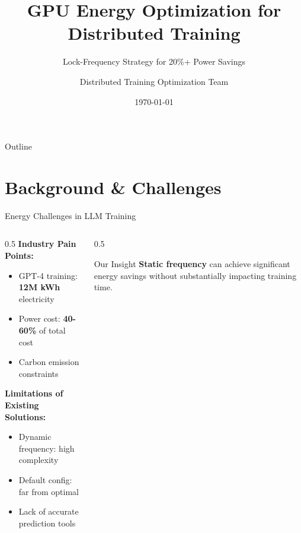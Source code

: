 \documentclass[aspectratio=169,10pt]{beamer}
\title[GPU Energy Optimization]{\textbf{GPU Energy Optimization for Distributed Training}}
\subtitle{Lock-Frequency Strategy for 20\%+ Power Savings}
\author[Team]{Distributed Training Optimization Team}
\institute[]{Megatron-DeepSpeed Energy Efficiency Project}
\date{\today}
\begin{document}
{
\begin{frame}
\titlepage
\end{frame}
}

\begin{frame}{Outline}
\tableofcontents
\end{frame}

\section{Background \& Challenges}

\begin{frame}{Energy Challenges in LLM Training}
\begin{columns}
\begin{column}{0.5\textwidth}
\textbf{Industry Pain Points:}
\begin{itemize}
    \item GPT-4 training: \textbf{12M kWh} electricity
    \item Power cost: \textbf{40-60\%} of total cost
    \item Carbon emission constraints
\end{itemize}
\vspace{0.5cm}
\textbf{Limitations of Existing Solutions:}
\begin{itemize}
    \item Dynamic frequency: high complexity
    \item Default config: far from optimal
    \item Lack of accurate prediction tools
\end{itemize}
\end{column}
\begin{column}{0.5\textwidth}
\begin{block}{Our Insight}
\textbf{Static frequency} can achieve significant energy savings without substantially impacting training time.
\end{block}
\vspace{0.3cm}
\end{column}
\end{columns}
\end{frame}
\end{document}
